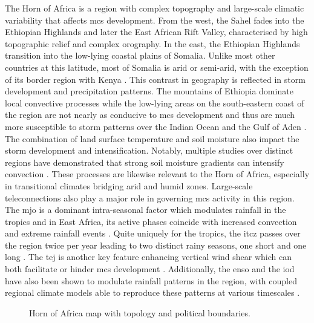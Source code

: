 The Horn of Africa is a region with complex topography and large-scale climatic variability that affects \acrshort{mcs} development. From the west, the Sahel fades into the Ethiopian Highlands and later the East African Rift Valley, characterised by high topographic relief and complex orography. In the east, the Ethiopian Highlands transition into the low-lying coastal plains of Somalia. Unlike most other countries at this latitude, most of Somalia is arid or semi-arid, with the exception of its border region with Kenya \citep{Beck2023}. This contrast in geography is reflected in storm development and precipitation patterns. The mountains of Ethiopia dominate local convective processes \citep{Negash2024} while the low-lying areas on the south-eastern coast of the region are not nearly as conducive to \acrshort{mcs} development and thus are much more susceptible to storm patterns over the Indian Ocean and the Gulf of Aden \citep{Camberlin2024}. The combination of land surface temperature and soil moisture also impact the storm development and intensification. Notably, multiple studies over distinct regions have demonstrated that strong soil moisture gradients can intensify convection \citep{Barton2021,Klein2020,Taylor2017}. These processes are likewise relevant to the Horn of Africa, especially in transitional climates bridging arid and humid zones. Large-scale \glspl{teleconnection} also play a major role in governing \acrshort{mcs} activity in this region. The \acrfull{mjo} is a dominant intra-seasonal factor which modulates rainfall in the tropics and in East Africa, its active phases coincide with increased convection and extreme rainfall events \citep{Camberlin2019,Ochieng2023,Pohl2006}. Quite uniquely for the tropics, the \acrfull{itcz} passes over the region twice per year leading to two distinct rainy seasons, one short and one long \citep{Palmer2023,Tefera2025}. The \acrfull{tej} is another key feature enhancing vertical wind shear which can both facilitate or hinder \acrshort{mcs} development \citep{Farnsworth2011,Vashisht2021}. Additionally, the \acrfull{enso} and the \acrfull{iod} have also been shown to modulate rainfall patterns in the region, with coupled regional climate models able to reproduce these patterns at various timescales \citep{Dubache2019,Endris2019,Vashisht2021,Zaroug2014}. 

\begin{figure}[h]
    \centering
    \caption{Horn of Africa map with topology and political boundaries.}
    \label{fig:horn-of-africa}
\end{figure}

